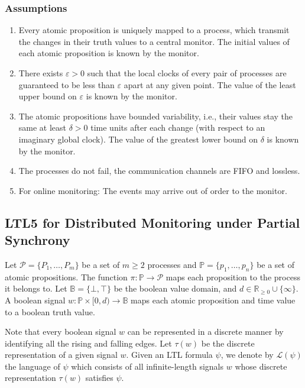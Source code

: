 \documentclass[envcountsame, runningheads]{llncs}
\title{}
\author{} %
\institute{} %
\date{}
\newcommand{\rednote}[2][]{{\todo[color=magenta!80,size=\footnotesize,#1]{\normalcolor\normalfont#2}}}
\newcommand{\R}{\mathbb{R}}
\newcommand{\B}{\mathbb{B}}
\newcommand{\?}{\text{?}}
\begin{document}
	\maketitle

	\subsubsection*{Assumptions}
	\begin{enumerate}
		\item Every atomic proposition is uniquely mapped to a process, which transmit the changes in their truth values to a central monitor. The initial values of each atomic proposition is known by the monitor.
		\item There exists $\varepsilon > 0$ such that the local clocks of every pair of processes are guaranteed to be less than $\varepsilon$ apart at any given point. The value of the least upper bound on $\varepsilon$ is known by the monitor. 
		\item The atomic propositions have bounded variability, i.e., their values stay the same at least $\delta > 0$ time units after each change (with respect to an imaginary global clock). The value of the greatest lower bound on $\delta$ is known by the monitor. 
		\item The processes do not fail, the communication channels are FIFO and lossless.
		\item For online monitoring: The events may arrive out of order to the monitor. \rednote{Not taken into account yet.}
	\end{enumerate}
	
	\subsection*{LTL5 for Distributed Monitoring under Partial Synchrony}
	Let $\mathcal{P} = \{P_1, \ldots, P_m\}$ be a set of $m \geq 2$ processes and $\mathbb{P} = \{p_1, \ldots, p_n\}$ be a set of atomic propositions.
	The function $\pi : \mathbb{P} \to \mathcal{P}$ maps each proposition to the process it belongs to.
	Let $\B = \{\bot, \top\}$ be the boolean value domain, and $d \in \R_{\geq 0} \cup \{\infty\}$.
	A boolean signal $w : \mathbb{P} \times [0,d) \to \B$ maps each atomic proposition and time value to a boolean truth value.

	Note that every boolean signal $w$ can be represented in a discrete manner by identifying all the rising and falling edges.
	Let $\tau(w)$ be the discrete representation of a given signal $w$.
	Given an LTL formula $\psi$, we denote by $\mathcal{L}(\psi)$ the language of $\psi$ which consists of all infinite-length signals $w$ whose discrete representation $\tau(w)$ satisfies $\psi$.
	
\end{document}
